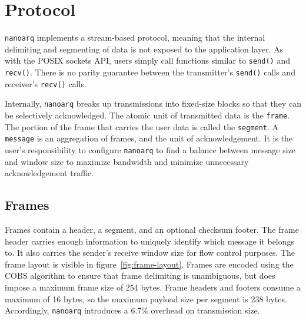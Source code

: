 \documentclass[11pt]{article}
\newcommand{\nanoarq}{\texttt{nanoarq}}
\begin{document}
\section{Protocol}
\nanoarq{} implements a stream-based protocol, meaning that the internal delimiting and segmenting of data is not exposed to the application layer. As with the POSIX sockets API, users simply call functions similar to \texttt{send()} and \texttt{recv()}. There is no parity guarantee between the transmitter's \texttt{send()} calls and receiver's \texttt{recv()} calls. \par
Internally, \nanoarq{} breaks up transmissions into fixed-size blocks so that they can be selectively acknowledged. The atomic unit of transmitted data is the \texttt{frame}. The portion of the frame that carries the user data is called the \texttt{segment}. A \texttt{message} is an aggregation of frames, and the unit of acknowledgement. It is the user's responsibility to configure \nanoarq{} to find a balance between message size and window size to maximize bandwidth and minimize unnecessary acknowledgement traffic. \par

\subsection{Frames}
Frames contain a header, a segment, and an optional checksum footer. The frame header carries enough information to uniquely identify which message it belongs to. It also carries the sender's receive window size for flow control purposes. The frame layout is visible in figure~\ref{fig:frame-layout}. Frames are encoded using the COBS algorithm to ensure that frame delimiting is unambiguous, but does impose a maximum frame size of 254 bytes. Frame headers and footers consume a maximum of 16 bytes, so the maximum payload size per segment is 238 bytes. Accordingly, \nanoarq{} introduces a 6.7\% overhead on transmission size. \\ \par
\end{document}
